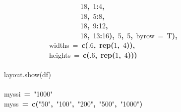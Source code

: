 \documentclass{article}
\makeatletter
\newcommand{\hlnumber}[1]{\textcolor[rgb]{0,0,0}{#1}}%
\newcommand{\hlfunctioncall}[1]{\textcolor[rgb]{0.501960784313725,0,0.329411764705882}{\textbf{#1}}}%
\newcommand{\hlstring}[1]{\textcolor[rgb]{0.6,0.6,1}{#1}}%
\newcommand{\hlkeyword}[1]{\textcolor[rgb]{0,0,0}{\textbf{#1}}}%
\newcommand{\hlargument}[1]{\textcolor[rgb]{0.690196078431373,0.250980392156863,0.0196078431372549}{#1}}%
\newcommand{\hlcomment}[1]{\textcolor[rgb]{0.180392156862745,0.6,0.341176470588235}{#1}}%
\newcommand{\hlassignement}[1]{\textcolor[rgb]{0,0,0}{\textbf{#1}}}%
\newcommand{\hlsymbol}[1]{\textcolor[rgb]{0,0,0}{#1}}%
\newcommand{\hlstd}[1]{\textcolor[rgb]{0,0,0}{#1}}%
\newenvironment{kframe}{%
 \def\FrameCommand##1{\hskip\@totalleftmargin \hskip-\fboxsep
 \colorbox{shadecolor}{##1}\hskip-\fboxsep
     \hskip-\linewidth \hskip-\@totalleftmargin \hskip\columnwidth}%
 \MakeFramed {\advance\hsize-\width
   \@totalleftmargin\z@ \linewidth\hsize
   \@setminipage}}%
 {\par\unskip\endMakeFramed}
\newenvironment{knitrout}{}{} %
\makeatother
\begin{document}
\begin{knitrout}
\begin{kframe}
\begin{flushleft}
\hlstd{}{\ }{\ }{\ }{\ }{\ }{\ }{\ }{\ }{\ }{\ }{\ }{\ }{\ }{\ }{\ }{\ }{\ }{\ }{\ }{\ }{\ }{\ }\hlnumber{18}\hlkeyword{,}{\ }\hlnumber{1}\hlkeyword{:}\hlnumber{4}\hlkeyword{,}\hspace*{\fill}\\
\hlstd{}{\ }{\ }{\ }{\ }{\ }{\ }{\ }{\ }{\ }{\ }{\ }{\ }{\ }{\ }{\ }{\ }{\ }{\ }{\ }{\ }{\ }{\ }\hlnumber{18}\hlkeyword{,}{\ }\hlnumber{5}\hlkeyword{:}\hlnumber{8}\hlkeyword{,}\hspace*{\fill}\\
\hlstd{}{\ }{\ }{\ }{\ }{\ }{\ }{\ }{\ }{\ }{\ }{\ }{\ }{\ }{\ }{\ }{\ }{\ }{\ }{\ }{\ }{\ }{\ }\hlnumber{18}\hlkeyword{,}{\ }\hlnumber{9}\hlkeyword{:}\hlnumber{12}\hlkeyword{,}\hspace*{\fill}\\
\hlstd{}{\ }{\ }{\ }{\ }{\ }{\ }{\ }{\ }{\ }{\ }{\ }{\ }{\ }{\ }{\ }{\ }{\ }{\ }{\ }{\ }{\ }{\ }\hlnumber{18}\hlkeyword{,}{\ }\hlnumber{13}\hlkeyword{:}\hlnumber{16}\hlkeyword{)}\hlkeyword{,}{\ }\hlnumber{5}\hlkeyword{,}{\ }\hlnumber{5}\hlkeyword{,}{\ }\hlargument{byrow}{\ }\hlargument{=}{\ }\hlsymbol{T}\hlkeyword{)}\hlkeyword{,}\hspace*{\fill}\\
\hlstd{}{\ }{\ }{\ }{\ }{\ }{\ }{\ }{\ }{\ }{\ }{\ }{\ }{\ }\hlargument{widths}{\ }\hlargument{=}{\ }\hlfunctioncall{c}\hlkeyword{(}\hlnumber{.6}\hlkeyword{,}{\ }\hlfunctioncall{rep}\hlkeyword{(}\hlnumber{1}\hlkeyword{,}{\ }\hlnumber{4}\hlkeyword{)}\hlkeyword{)}\hlkeyword{,}\hspace*{\fill}\\
\hlstd{}{\ }{\ }{\ }{\ }{\ }{\ }{\ }{\ }{\ }{\ }{\ }{\ }{\ }\hlargument{heights}{\ }\hlargument{=}{\ }\hlfunctioncall{c}\hlkeyword{(}\hlnumber{.6}\hlkeyword{,}{\ }\hlfunctioncall{rep}\hlkeyword{(}\hlnumber{1}\hlkeyword{,}{\ }\hlnumber{4}\hlkeyword{)}\hlkeyword{)}\hlkeyword{)}\hspace*{\fill}\\
\hlstd{}\hspace*{\fill}\\
\hlstd{}\hlcomment{\usebox{\hlnormalsizeboxhash}layout.show(df)}\hspace*{\fill}\\
\hlstd{}\hspace*{\fill}\\
\hlstd{}\hlsymbol{myssi}{\ }\hlassignement{=}{\ }\hlstring{"{}1000"{}}\hspace*{\fill}\\
\hlstd{}\hlsymbol{myss}{\ }\hlassignement{=}{\ }\hlfunctioncall{c}\hlkeyword{(}\hlstring{"{}50"{}}\hlkeyword{,}{\ }\hlstring{"{}100"{}}\hlkeyword{,}{\ }\hlstring{"{}200"{}}\hlkeyword{,}{\ }\hlstring{"{}500"{}}\hlkeyword{,}{\ }\hlstring{"{}1000"{}}\hlkeyword{)}\hspace*{\fill}\\

\end{flushleft}
\end{kframe}
\end{knitrout}
\end{document}
